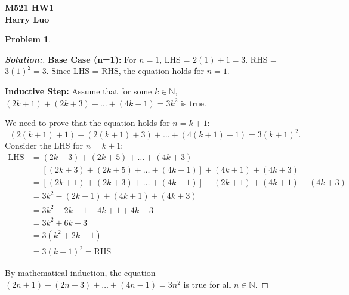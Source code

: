 \documentclass[12pt]{article}
\theoremstyle{definition}\newtheorem{problem}{Problem}
\newenvironment{solution}{\begin{proof}[\bfseries\textup{Solution:}]}{\end{proof}}
\begin{document}

\begin{center}
\bfseries M521 HW1\\ Harry Luo%
 
\end{center}

\begin{problem}

\end{problem}
\begin{solution}


    
 \textbf{Base Case (n=1):}
       For $n=1$, LHS = $2(1)+1 = 3$. RHS = $3(1)^2 = 3$.
       Since LHS = RHS, the equation holds for $n=1$.
    
 \textbf{Inductive Step:}
       Assume that for some $k \in \mathbb{N}$, $(2k+1) + (2k+3) + \ldots + (4k-1) = 3k^2$ is true.

       We need to prove that the equation holds for $n=k+1$:
       $$(2(k+1)+1) + (2(k+1)+3) + \ldots + (4(k+1)-1) = 3(k+1)^2.$$
       Consider the LHS for $n=k+1$:
       \begin{align*}
       \text{LHS} &= (2k+3) + (2k+5) + \ldots + (4k+3) \\
             &= [(2k+3) + (2k+5) + \ldots + (4k-1)] + (4k+1) + (4k+3) \\
             &= [(2k+1) + (2k+3) + \ldots + (4k-1)] - (2k+1) + (4k+1) + (4k+3) \\
             &= 3k^2 - (2k+1) + (4k+1) + (4k+3) \\
             &= 3k^2 - 2k - 1 + 4k + 1 + 4k + 3 \\
             &= 3k^2 + 6k + 3 \\
             &= 3(k^2 + 2k + 1) \\
             &= 3(k+1)^2 = \text{RHS}
       \end{align*}
       
    
       By mathematical induction, the equation $(2n+1) + (2n+3) + \ldots + (4n-1) = 3n^2$ is true for all $n \in \mathbb{N}$.


\end{solution}
\end{document}
